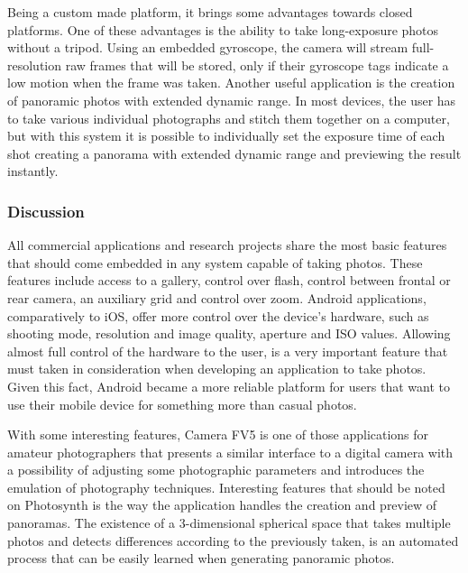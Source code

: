 Being a custom made platform, it brings some advantages towards closed platforms. One of these advantages is the ability to take long-exposure photos without a tripod. Using an embedded gyroscope, the camera will stream full-resolution raw frames that will be stored, only if their gyroscope tags indicate a low motion when the frame was taken. 
Another useful application is the creation of panoramic photos with extended dynamic range. In most devices, the user has to take various individual photographs and stitch them together on a computer, but with this system it is possible to individually set the exposure time of each shot creating a panorama with extended dynamic range and previewing the result instantly.

\subsubsection{Discussion}

All commercial applications and research projects share the most basic features that should come embedded in any system capable of taking photos. These features include access to a gallery, control over flash, control between frontal or rear camera, an auxiliary grid and control over zoom.
Android applications, comparatively to iOS, offer more control over the device's hardware, such as shooting mode, resolution and image quality, aperture and ISO values. Allowing almost full control of the hardware to the user, is a very important feature that must taken in consideration when developing an application to take photos. Given this fact, Android became a more reliable platform for users that want to use their mobile device for something more than casual photos.

With some interesting features, Camera FV5  is one of those applications for amateur photographers that presents a similar interface to a digital camera with a possibility of adjusting some photographic parameters and introduces the emulation of photography techniques.
Interesting features that should be noted on Photosynth is the way the application handles the creation and preview of panoramas. The existence of a 3-dimensional spherical space that takes multiple photos and detects differences according to the previously taken, is an automated process that can be easily learned when generating panoramic photos.


